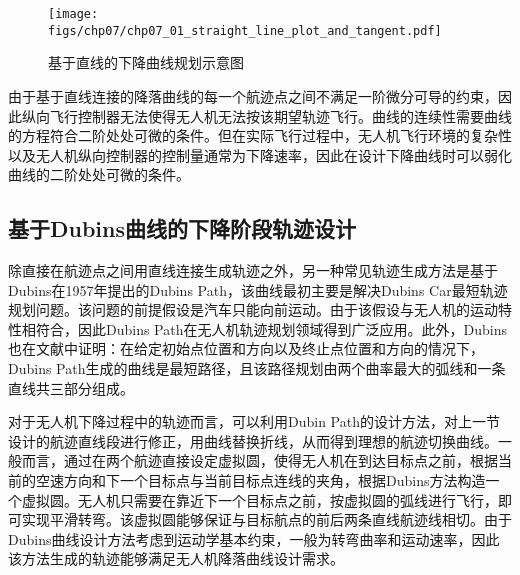 \begin{figure}[ht]   
	\centering
	\texttt{[image: figs/chp07/chp07\_01\_straight\_line\_plot\_and\_tangent.pdf]}
	\caption{基于直线的下降曲线规划示意图}
	\label{fig:chp07_01_straight_line_plot_and_tangent}
\end{figure}
由于基于直线连接的降落曲线的每一个航迹点之间不满足一阶微分可导的约束，因此纵向飞行控制器无法使得无人机无法按该期望轨迹飞行。曲线的连续性需要曲线的方程符合二阶处处可微的条件。但在实际飞行过程中，无人机飞行环境的复杂性以及无人机纵向控制器的控制量通常为下降速率，因此在设计下降曲线时可以弱化曲线的二阶处处可微的条件。


\subsection{基于Dubins曲线的下降阶段轨迹设计}
除直接在航迹点之间用直线连接生成轨迹之外，另一种常见轨迹生成方法是基于Dubins在1957年提出的Dubins Path\cite{dubins1957curves}，该曲线最初主要是解决Dubins Car最短轨迹规划问题。该问题的前提假设是汽车只能向前运动。由于该假设与无人机的运动特性相符合，因此Dubins Path在无人机轨迹规划领域得到广泛应用。此外，Dubins也在文献\cite{dubins1957curves}中证明：在给定初始点位置和方向以及终止点位置和方向的情况下，Dubins Path生成的曲线是最短路径，且该路径规划由两个曲率最大的弧线和一条直线共三部分组成。

对于无人机下降过程中的轨迹而言，可以利用Dubin Path的设计方法，对上一节设计的航迹直线段进行修正，用曲线替换折线，从而得到理想的航迹切换曲线。一般而言，通过在两个航迹直接设定虚拟圆，使得无人机在到达目标点之前，根据当前的空速方向和下一个目标点与当前目标点连线的夹角，根据Dubins方法构造一个虚拟圆。无人机只需要在靠近下一个目标点之前，按虚拟圆的弧线进行飞行，即可实现平滑转弯。该虚拟圆能够保证与目标航点的前后两条直线航迹线相切。由于Dubins曲线设计方法考虑到运动学基本约束，一般为转弯曲率和运动速率，因此该方法生成的轨迹能够满足无人机降落曲线设计需求。

